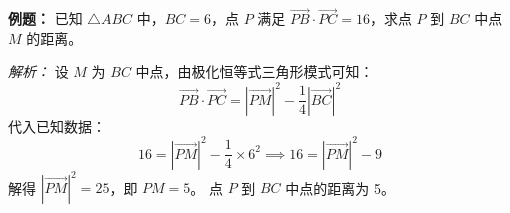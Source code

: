 \begin{examplebox}
\textbf{例题：} 已知 $\triangle ABC$ 中，$BC=6$，点 $P$ 满足 $\vec{PB} \cdot \vec{PC} = 16$，求点 $P$ 到 $BC$ 中点 $M$ 的距离。

\textit{解析：} 
设 $M$ 为 $BC$ 中点，由极化恒等式三角形模式可知：
\[ \vec{PB} \cdot \vec{PC} = |\vec{PM}|^2 - \frac{1}{4}|\vec{BC}|^2 \]
代入已知数据：
\[ 16 = |\vec{PM}|^2 - \frac{1}{4} \times 6^2 \implies 16 = |\vec{PM}|^2 - 9 \]
解得 $|\vec{PM}|^2 = 25$，即 $PM = 5$。
点 $P$ 到 $BC$ 中点的距离为 5。
\end{examplebox}